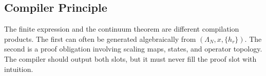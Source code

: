 \subsection{Compiler Principle}

The finite expression and the continuum theorem are different compilation
products.  The first can often be generated algebraically from
\((\Lambda_N,x,\{h_r\})\).  The second is a proof obligation involving scaling
maps, states, and operator topology.  The compiler should output both slots, but
it must never fill the proof slot with intuition.
